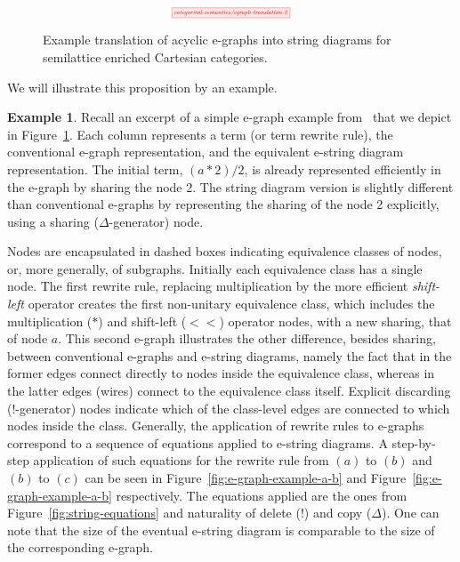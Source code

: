 \documentclass[sigconf, 9pt, nonacm]{acmart}
\theoremstyle{definition}
\newtheorem{example}[thm]{Example}
\begin{document}
\begin{figure}
    \[
        \scalebox{0.5}{
        \tikzfig{categorical-semantics/egraph-translation-2}
        }
    \]
    \caption{Example translation of acyclic e-graphs into string diagrams for semilattice enriched Cartesian categories. }
    \label{fig:e-graph-example}
\end{figure}

We will illustrate this proposition by an example.
\begin{example}
    Recall an excerpt of a simple e-graph example from~\cite{EggPaper} that we depict in Figure~\ref{fig:e-graph-example}.
    Each column represents a term (or term rewrite rule), the conventional e-graph representation, and the equivalent e-string diagram representation. 
The initial term, $(a*2)/2$, is already represented efficiently in the e-graph by sharing the node 2.
The string diagram version is slightly different than conventional e-graphs by representing the sharing of the node 2 explicitly, using a sharing ($\Delta$-generator) node. 

Nodes are encapsulated in dashed boxes indicating equivalence classes of nodes, or, more generally, of subgraphs. 
Initially each equivalence class has a single node. 
The first rewrite rule, replacing multiplication by the more efficient \emph{shift-left} operator creates the first non-unitary equivalence class, which includes the multiplication ($*$) and shift-left ($<\!\!<$) operator nodes, with a new sharing, that of node $a$. 
This second e-graph illustrates the other difference, besides sharing, between conventional e-graphs and e-string diagrams, namely the fact that in the former edges connect directly to nodes inside the equivalence class, whereas in the latter edges (wires) connect to the equivalence class itself. 
Explicit discarding ($!$-generator) nodes indicate which of the class-level edges are connected to which nodes inside the class. 
Generally, the application of rewrite rules to e-graphs correspond to a sequence of equations applied to e-string diagrams.
A step-by-step application of such equations for the rewrite rule from $(a)$ to $(b)$ and $(b)$ to $(c)$ can be seen in Figure~\ref{fig:e-graph-example-a-b} and Figure~\ref{fig:e-graph-example-a-b} respectively.
The equations applied are the ones from Figure~\ref{fig:string-equations} and naturality of delete ($!$) and copy ($\Delta$).
One can note that the size of the eventual e-string diagram is comparable to the size of the corresponding e-graph.
\end{example}
\end{document}
